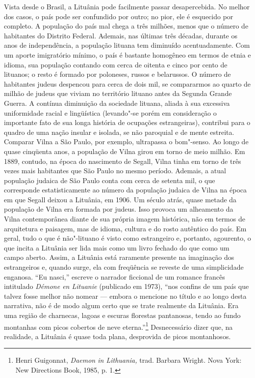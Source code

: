 {Vista desde o Brasil, a Lituânia pode facilmente passar desapercebida.
No melhor dos casos, o país pode ser confundido por outro; no pior, ele
é esquecido por completo. A população do país mal chega a três milhões,
menos que o número de habitantes do Distrito Federal. Ademais, nas
últimas três décadas, durante os anos de independência, a população
lituana tem diminuído acentuadamente. Com um aporte imigratório mínimo,
o país é bastante homogêneo em termos de etnia e idioma, sua população
contando com cerca de oitenta e cinco por cento de lituanos; o resto é
formado por poloneses, russos e belarussos. O número de habitantes
judeus despencou para cerca de dois mil, se compararmos ao quarto de
milhão de judeus que viviam no território lituano antes da Segunda
Grande Guerra. A contínua diminuição da sociedade lituana, aliada à sua
excessiva uniformidade racial e lingüística (levando"-se porém em
consideração o importante fato de sua longa história de ocupações
estrangeiras), contribui para o quadro de uma nação insular e isolada,
se não paroquial e de mente estreita. Comparar Vilna a São Paulo, por
exemplo, ultrapassa o bom"-senso. Ao longo de quase cinqüenta anos, a
população de Vilna girou em torno de meio milhão. Em 1889, contudo, na
época do nascimento de Segall, Vilna tinha em torno de três vezes mais
habitantes que São Paulo no mesmo período. Ademais, a atual população
judaica de São Paulo conta com cerca de setenta mil, o que corresponde
estatisticamente ao número da população judaica de Vilna na época em que
Segall deixou a Lituânia, em 1906. Um século atrás, quase metade da
população de Vilna era formada por judeus. Isso provoca um alheamento da
Vilna contemporânea diante de sua própria imagem histórica, não em
termos de arquitetura e paisagem, mas de idioma, cultura e do rosto
autêntico do país. Em geral, tudo o que é não"-lituano é visto como
estrangeiro e, portanto, agourento, o que incita a Lituânia ser lida
mais como um livro fechado do que como um campo aberto. Assim, a
Lituânia está raramente presente na imaginação dos estrangeiros e,
quando surge, ela com freqüência se reveste de uma simplicidade
enganosa. ``Eu nasci,'' escreve o narrador ficcional de um romance
francês intitulado \textit{Démone en Lituanie} (publicado em 1973), ``nos
confins de um país que talvez fosse melhor não nomear --- embora o
mencione no título e ao longo desta narrativa, não é de modo algum certo
que se trate realmente da Lituânia. Era uma região de charnecas, lagoas
e escuras florestas pantanosas, tendo ao fundo montanhas com picos
cobertos de neve eterna.''\footnote{Henri Guigonnat, \textit{Daemon in
  Lithuania,} trad. Barbara Wright. Nova York: New Directions Book,
  1985, p. 1.} Desnecessário dizer que, na realidade, a Lituânia é quase
toda plana, desprovida de picos montanhosos.

}
